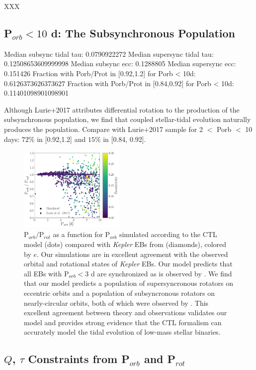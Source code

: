 \documentclass[twocolumn]{aastex61}
\newcommand{\kepler}[0]{\textit{Kepler}\xspace}
\begin{document}
XXX

\subsection{P$_{orb} < 10$ d: The Subsynchronous Population} \label{sec:subsync}

Median subsync tidal tau: 0.0790922272
Median supersync tidal tau: 0.12508653609999998
Median subsync ecc: 0.1288805
Median supersync ecc: 0.151426
Fraction with Porb/Prot in [0.92,1.2] for Porb < 10d: 0.6126373626373627
Fraction with Porb/Prot in [0.84,0.92] for Porb < 10d: 0.11401098901098901


Although Lurie+2017 attributes differential rotation to the production of the
subsynchronous population, we find that coupled stellar-tidal evolution naturally
produces the population. Compare with Lurie+2017 sample for 2 $<$ Porb $<$ 10 days:
$72\%$ in [0.92,1.2] and $15\%$ in [0.84, 0.92].


\begin{figure}
	\includegraphics[width=0.45\textwidth]{../Plots/subsync.pdf}
   \caption{P$_{orb}/$P$_{rot}$ as a function for P$_{orb}$ simulated according to the CTL model (dots) compared with \kepler EBs from \citet{Lurie2017} (diamonds), colored by $e$. Our simulations are in excellent agreement with the observed orbital and rotational states of \kepler EBs. Our model predicts that all EBs with P$_{orb} < 3$ d are synchronized as is observed by \citet{Lurie2017}. We find that our model predicts a population of supersyncronous rotators on eccentric orbits and a population of subsyncronous rotators on nearly-circular orbits, both of which were observed by \citet{Lurie2017}. This excellent agreement between theory and observations validates our model and provides strong evidence that the CTL formalism can accurately model the tidal evolution of low-mass stellar binaries.}%
    \label{fig:subsync}%
\end{figure}

\subsection{$Q$, $\tau$ Constraints from P$_{orb}$ and P$_{rot}$} \label{sec:qTau}
\end{document}
